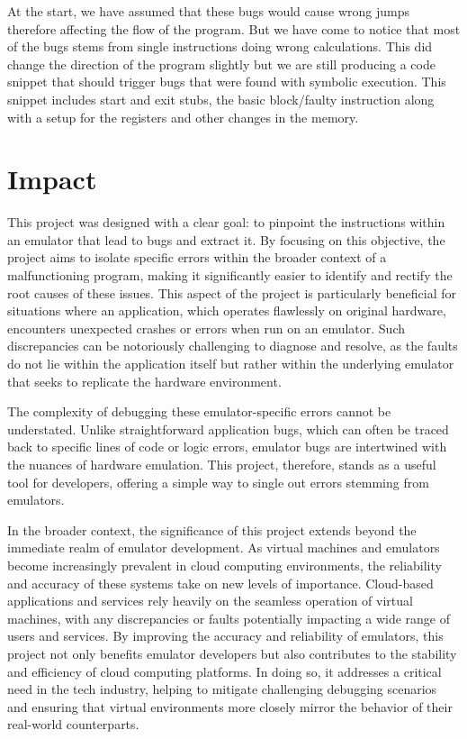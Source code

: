 At the start, we have assumed that these bugs would cause wrong jumps therefore affecting the flow of the program.
But we have come to notice that most of the bugs stems from single instructions doing wrong calculations.
This did change the direction of the program slightly but we are still producing a code snippet that should trigger bugs that were found with symbolic execution.
This snippet includes start and exit stubs, the basic block/faulty instruction along with a setup for the registers and other changes in the memory.

\section{Impact}
This project was designed with a clear goal: to pinpoint the instructions within an emulator that lead to bugs and extract it.
By focusing on this objective, the project aims to isolate specific errors within the broader context of a malfunctioning program, making it significantly easier to identify and rectify the root causes of these issues.
This aspect of the project is particularly beneficial for situations where an application, which operates flawlessly on original hardware, encounters unexpected crashes or errors when run on an emulator.
Such discrepancies can be notoriously challenging to diagnose and resolve, as the faults do not lie within the application itself but rather within the underlying emulator that seeks to replicate the hardware environment.

The complexity of debugging these emulator-specific errors cannot be understated.
Unlike straightforward application bugs, which can often be traced back to specific lines of code or logic errors, emulator bugs are intertwined with the nuances of hardware emulation.
This project, therefore, stands as a useful tool for developers, offering a simple way to single out errors stemming from emulators.

In the broader context, the significance of this project extends beyond the immediate realm of emulator development.
As virtual machines and emulators become increasingly prevalent in cloud computing environments, the reliability and accuracy of these systems take on new levels of importance.
Cloud-based applications and services rely heavily on the seamless operation of virtual machines, with any discrepancies or faults potentially impacting a wide range of users and services.
By improving the accuracy and reliability of emulators, this project not only benefits emulator developers but also contributes to the stability and efficiency of cloud computing platforms.
In doing so, it addresses a critical need in the tech industry, helping to mitigate challenging debugging scenarios and ensuring that virtual environments more closely mirror the behavior of their real-world counterparts.


